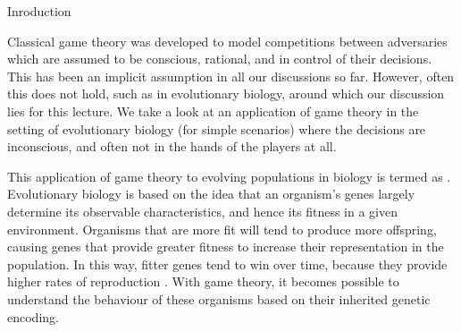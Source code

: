 \documentclass{article}
\begin{document}
\makeheader

\begin{ssection}{Inroduction}

	Classical game theory was developed to model competitions between adversaries which are assumed to be conscious, rational, and in control of their decisions. This has been an implicit assumption in all our discussions so far. However, often this does not hold, such as in evolutionary biology, around which our discussion lies for this lecture. We take a look at an application of game theory in the setting of evolutionary biology (for simple scenarios) where the decisions are inconscious, and often not in the hands of the players at all.

	This application of game theory to evolving populations in biology is termed as  \citep{smith}. Evolutionary biology is based on the idea that an organism’s genes largely determine its observable characteristics, and hence its fitness in a given environment. Organisms that are more fit will tend to produce more offspring, causing genes that provide greater fitness to increase their representation in the population. In this way, fitter genes tend to win over time, because they provide higher rates of reproduction \citep{kleinberg}. With game theory, it becomes possible to understand the behaviour of these organisms based on their inherited genetic encoding.


\end{ssection}
\end{document}

